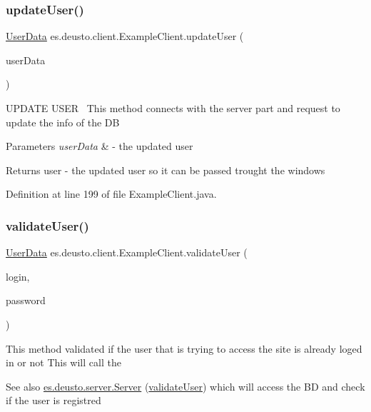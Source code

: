 \subsubsection{\texorpdfstring{update\+User()}{updateUser()}}
{\footnotesize\ttfamily \hyperlink{classes_1_1deusto_1_1serialization_1_1_user_data}{User\+Data} es.\+deusto.\+client.\+Example\+Client.\+update\+User (\begin{DoxyParamCaption}\item[{\hyperlink{classes_1_1deusto_1_1serialization_1_1_user_data}{User\+Data}}]{user\+Data }\end{DoxyParamCaption})}

U\+P\+D\+A\+TE U\+S\+ER~\newline
This method connects with the server part and request to update the info of the DB 
\begin{DoxyParams}{Parameters}
{\em user\+Data} & -\/ the updated user \\
\hline
\end{DoxyParams}
\begin{DoxyReturn}{Returns}
user -\/ the updated user so it can be passed trought the windows 
\end{DoxyReturn}


Definition at line 199 of file Example\+Client.\+java.

\mbox{\label{classes_1_1deusto_1_1client_1_1_example_client_a740fa7000d0cd30603ce100b299ba8ba}} 
\subsubsection{\texorpdfstring{validate\+User()}{validateUser()}}
{\footnotesize\ttfamily \hyperlink{classes_1_1deusto_1_1serialization_1_1_user_data}{User\+Data} es.\+deusto.\+client.\+Example\+Client.\+validate\+User (\begin{DoxyParamCaption}\item[{String}]{login,  }\item[{String}]{password }\end{DoxyParamCaption})}

This method validated if the user that is trying to access the site is already loged in or not This will call the \begin{DoxySeeAlso}{See also}
\hyperlink{classes_1_1deusto_1_1server_1_1_server}{es.\+deusto.\+server.\+Server} (\hyperlink{classes_1_1deusto_1_1client_1_1_example_client_a740fa7000d0cd30603ce100b299ba8ba}{validate\+User}) which will access the BD and check if the user is registred 
\end{DoxySeeAlso}

